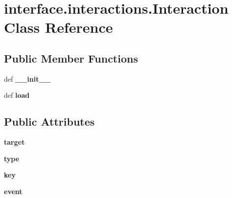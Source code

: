 \hypertarget{classinterface_1_1interactions_1_1_interaction}{\section{interface.\-interactions.\-Interaction \-Class \-Reference}
\label{classinterface_1_1interactions_1_1_interaction}
}
\subsection*{\-Public \-Member \-Functions}
\begin{DoxyCompactItemize}
\item 
\hypertarget{classinterface_1_1interactions_1_1_interaction_a8e24342fbab9b8508ab2c037cb2facf0}{def {\bfseries \-\_\-\-\_\-init\-\_\-\-\_\-}}\label{classinterface_1_1interactions_1_1_interaction_a8e24342fbab9b8508ab2c037cb2facf0}

\item 
\hypertarget{classinterface_1_1interactions_1_1_interaction_a077e8944f45e377ad3e6c225a545aa86}{def {\bfseries load}}\label{classinterface_1_1interactions_1_1_interaction_a077e8944f45e377ad3e6c225a545aa86}

\end{DoxyCompactItemize}
\subsection*{\-Public \-Attributes}
\begin{DoxyCompactItemize}
\item 
\hypertarget{classinterface_1_1interactions_1_1_interaction_a00cd1dee9a8dba184edb37428380bb92}{{\bfseries target}}\label{classinterface_1_1interactions_1_1_interaction_a00cd1dee9a8dba184edb37428380bb92}

\item 
\hypertarget{classinterface_1_1interactions_1_1_interaction_afae7611b19a4850489268d42de12281d}{{\bfseries type}}\label{classinterface_1_1interactions_1_1_interaction_afae7611b19a4850489268d42de12281d}

\item 
\hypertarget{classinterface_1_1interactions_1_1_interaction_a684bc327719b7885001513805775aae7}{{\bfseries key}}\label{classinterface_1_1interactions_1_1_interaction_a684bc327719b7885001513805775aae7}

\item 
\hypertarget{classinterface_1_1interactions_1_1_interaction_aa0201055cceaccb25b7808f2e8f39856}{{\bfseries event}}\label{classinterface_1_1interactions_1_1_interaction_aa0201055cceaccb25b7808f2e8f39856}

\end{DoxyCompactItemize}


